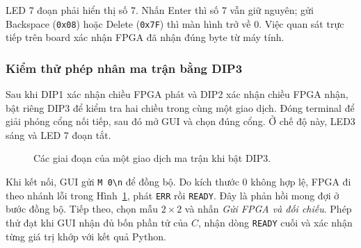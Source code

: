 LED 7 đoạn phải hiển thị số 7. Nhấn Enter thì số 7 vẫn giữ nguyên;
gửi Backspace (\texttt{0x08}) hoặc Delete (\texttt{0x7F}) thì
màn hình trở về 0. Việc quan sát trực tiếp trên board xác nhận FPGA
đã nhận đúng byte từ máy tính.

\subsubsection{Kiểm thử phép nhân ma trận bằng DIP3}

Sau khi DIP1 xác nhận chiều FPGA phát và DIP2 xác nhận chiều FPGA
nhận, bật riêng DIP3 để kiểm tra hai chiều trong cùng một giao dịch.
Đóng terminal để giải phóng cổng nối tiếp, sau đó mở GUI và chọn
đúng cổng. Ở chế độ này, LED3 sáng và LED 7 đoạn tắt.

\begin{figure}[htbp]
\centering
{}
\caption{Các giai đoạn của một giao dịch ma trận khi bật DIP3.}
\label{fig:uart_dip3_matrix}
\end{figure}

Khi kết nối, GUI gửi \verb|M 0\n| để đồng bộ. Do kích thước 0
không hợp lệ, FPGA đi theo nhánh lỗi trong
Hình~\ref{fig:uart_dip3_matrix}, phát \texttt{ERR} rồi
\texttt{READY}. Đây là phản hồi mong đợi ở bước đồng bộ.
Tiếp theo, chọn mẫu $2\times2$ và nhấn
\textit{Gửi FPGA và đối chiếu}. Phép thử đạt khi GUI nhận đủ
bốn phần tử của $C$, nhận dòng \texttt{READY} cuối và xác nhận
từng giá trị khớp với kết quả Python.


